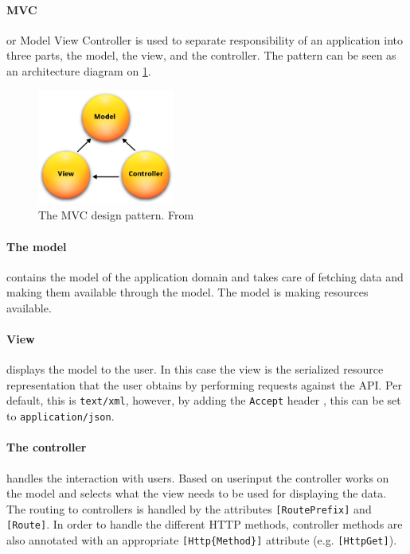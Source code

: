 \paragraph{MVC} or Model View Controller\citet{aspmvc} is used to separate responsibility of an application into three parts, the model, the view, and the controller.
The pattern can be seen as an architecture diagram on \cref{mvcdiagram}.

\begin{figure}[h]
\center
\includegraphics[width=0.4\textwidth]{graphics/mvc}
\caption{The MVC design pattern. From \citet{aspmvc}}
\label{mvcdiagram}
\end{figure}

\paragraph{The model } contains the model of the application domain and takes care of fetching data and making them available through the model.
The model is making resources available.

\paragraph{View} displays the model to the user.
In this case the view is the serialized resource representation that the user obtains by performing requests against the API.
Per default, this is \texttt{text/xml}, however, by adding the \texttt{Accept} header , this can be set to \texttt{application/json}.

\paragraph{The controller} handles the interaction with users. Based on userinput the controller works on the model and selects what the view needs to be used for displaying the data.
The routing to controllers is handled by the attributes \texttt{[RoutePrefix]} and \texttt{[Route]}.
In order to handle the different HTTP methods, controller methods are also annotated with an appropriate \texttt{[Http\{Method\}]} attribute (e.g. \texttt{[HttpGet]}).
